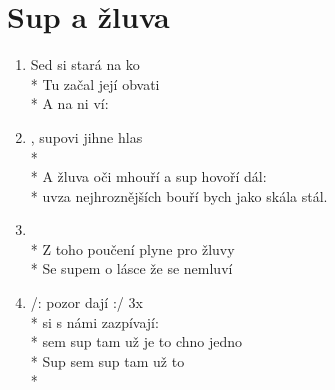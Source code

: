 \section{Sup a žluva}
\begin{enumerate}
\item Sed si stará  na ko  \\*
Tu začal její  obvati  \\*
A  na ni ví:  
\item {}, supovi jihne hlas \\*
 \\*
A žluva oči mhouří a sup hovoří dál: \\*
uv{za nejhroznějších bouří bych jako skála stál.} 
\item {}\\*
Z toho poučení plyne pro žluvy \\*
Se supem o lásce že se nemluví 
\item /:  pozor dají :/ 3x \\*
 si s námi zazpívají: \\*
 sem sup tam  už je to chno jedno \\*
Sup sem sup tam  už  to  \\*
\end{enumerate}
